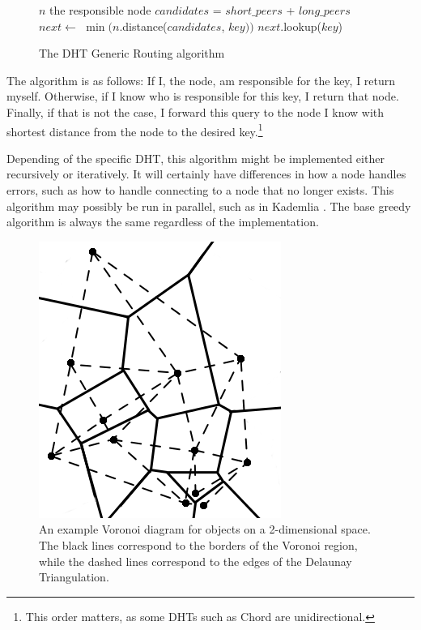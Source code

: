 \begin{figure}
	\caption{The DHT Generic Routing algorithm}
	\label{alg:routing}
	\small
	\begin{algorithmic}[1]
				\State \Return $ n $
			\EndIf
				\State \Return the responsible node
			\EndIf
			\State $ candidates $ = $ short\_peers $ + $ long\_peers $
			\State $ next  \leftarrow $  $\min (n$.distance($candidates$, $ key ))$
			\State \Return $next.$lookup($key$)
		\EndFunction
	\end{algorithmic}
	
	\scriptsize
\end{figure}
The algorithm is as follows:
If I, the node, am responsible for the key, I return myself.
Otherwise, if I know who is responsible for this key, I return that node.
Finally, if that is not the case, I forward this query to the node I know with shortest distance from the node to the desired key.\footnote{This order matters, as some DHTs such as Chord are unidirectional.} 

Depending of the specific DHT, this algorithm might be implemented either recursively or iteratively.
It will certainly have differences in how a node handles errors, such as how to handle connecting to a node that no longer exists.
This algorithm may possibly be run in parallel, such as in Kademlia \cite{kademlia}.
The base greedy algorithm is always the same regardless of the implementation.


\begin{figure}
	\centering
	\includegraphics[width=0.5\linewidth]{voronoi}
	\caption{An example Voronoi diagram for objects on a 2-dimensional space.  The black lines correspond to the borders of the Voronoi region, while the dashed lines correspond to the edges of the Delaunay Triangulation.}
	\label{voro-ex}
\end{figure}


